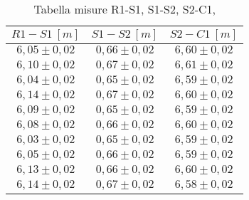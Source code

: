 \begin{table}[H]
    \centering
        \begin{tabular}{|c|c|c|}
        \hline
        $ R1-S1~[m] $ & $ S1-S2~[m] $ & $ S2-C1~[m] $\\
        \hline
        $ 6,05 \pm 0,02 $ & $ 0,66 \pm 0,02 $ & $ 6,60 \pm 0,02 $\\
        \hline
        $ 6,10 \pm 0,02 $ & $ 0,67 \pm 0,02 $ & $ 6,61 \pm 0,02 $\\
        \hline
        $ 6,04 \pm 0,02 $ & $ 0,65 \pm 0,02 $ & $ 6,59 \pm 0,02 $\\
        \hline
        $ 6,14 \pm 0,02 $ & $ 0,67 \pm 0,02 $ & $ 6,60 \pm 0,02 $\\
        \hline
        $ 6,09 \pm 0,02 $ & $ 0,65 \pm 0,02 $ & $ 6,59 \pm 0,02 $\\
        \hline
        $ 6,08 \pm 0,02 $ & $ 0,66 \pm 0,02 $ & $ 6,60 \pm 0,02 $\\
        \hline
        $ 6,03 \pm 0,02 $ & $ 0,65 \pm 0,02 $ & $ 6,59 \pm 0,02 $\\
        \hline
        $ 6,05 \pm 0,02 $ & $ 0,66 \pm 0,02 $ & $ 6,59 \pm 0,02 $\\
        \hline
        $ 6,13 \pm 0,02 $ & $ 0,66 \pm 0,02 $ & $ 6,60 \pm 0,02 $\\
        \hline
        $ 6,14 \pm 0,02 $ & $ 0,67 \pm 0,02 $ & $ 6,58 \pm 0,02 $\\
        \hline
        \end{tabular}
    \caption{Tabella misure R1-S1, S1-S2, S2-C1,}
\end{table}